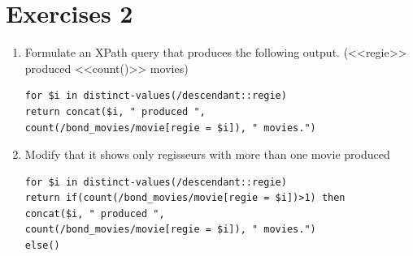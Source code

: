 \section{Exercises 2}
\begin{enumerate}
\item Formulate an XPath query that produces the following output. (<<regie>> produced <<count()>> movies)
\begin{lstlisting}[language=XML]
for $i in distinct-values(/descendant::regie) 
return concat($i, " produced ",
count(/bond_movies/movie[regie = $i]), " movies.")
\end{lstlisting}

\item Modify that it shows only regisseurs with more than one movie produced
\begin{lstlisting}[language=XML]
for $i in distinct-values(/descendant::regie) 
return if(count(/bond_movies/movie[regie = $i])>1) then
concat($i, " produced ",
count(/bond_movies/movie[regie = $i]), " movies.")
else()
\end{lstlisting}
\end{enumerate}

